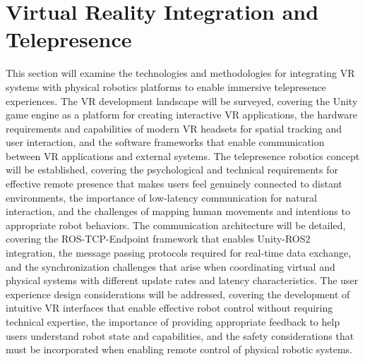 \section{Virtual Reality Integration and Telepresence}
This section will examine the technologies and methodologies for integrating VR systems with physical robotics platforms to enable immersive telepresence experiences. The VR development landscape will be surveyed, covering the Unity game engine as a platform for creating interactive VR applications, the hardware requirements and capabilities of modern VR headsets for spatial tracking and user interaction, and the software frameworks that enable communication between VR applications and external systems. The telepresence robotics concept will be established, covering the psychological and technical requirements for effective remote presence that makes users feel genuinely connected to distant environments, the importance of low-latency communication for natural interaction, and the challenges of mapping human movements and intentions to appropriate robot behaviors. The communication architecture will be detailed, covering the ROS-TCP-Endpoint framework that enables Unity-ROS2 integration, the message passing protocols required for real-time data exchange, and the synchronization challenges that arise when coordinating virtual and physical systems with different update rates and latency characteristics. The user experience design considerations will be addressed, covering the development of intuitive VR interfaces that enable effective robot control without requiring technical expertise, the importance of providing appropriate feedback to help users understand robot state and capabilities, and the safety considerations that must be incorporated when enabling remote control of physical robotic systems.
